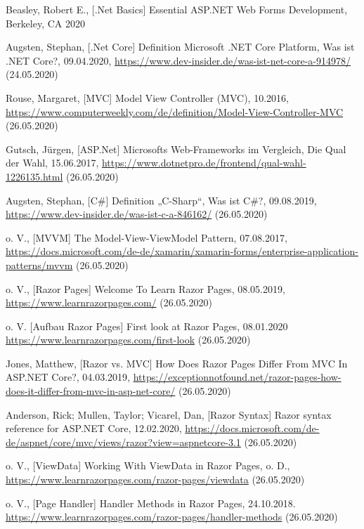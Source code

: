 \documentclass[a4paper,
12pt,
oneside]
{article}
\begin{document}
	\thispagestyle{empty}
	\nocite{*}
	\begin{thebibliography}{}
		 Beasley, Robert E., [.Net Basics] Essential ASP.NET Web Forms Development, Berkeley, CA 2020 
		
		 Augsten, Stephan, [.Net Core] Definition \glqq Microsoft .NET Core Platform\grqq, Was ist .NET Core?, 09.04.2020, \url{https://www.dev-insider.de/was-ist-net-core-a-914978/} (24.05.2020)
		
		 Rouse, Margaret, [MVC] Model View Controller (MVC), 10.2016, \url{https://www.computerweekly.com/de/definition/Model-View-Controller-MVC} (26.05.2020)
		
		 Gutsch, Jürgen, [ASP.Net] Microsofts Web-Frameworks im Vergleich, Die Qual der Wahl, 15.06.2017, \url{https://www.dotnetpro.de/frontend/qual-wahl-1226135.html} (26.05.2020)
		
		 Augsten, Stephan, [C\#] Definition „C-Sharp“, Was ist C\#?, 09.08.2019, \url{https://www.dev-insider.de/was-ist-c-a-846162/} (26.05.2020)
		
		 o. V., [MVVM] The Model-View-ViewModel Pattern, 07.08.2017, \url{https://docs.microsoft.com/de-de/xamarin/xamarin-forms/enterprise-application-patterns/mvvm} (26.05.2020)
		
		 o. V., [Razor Pages] Welcome To Learn Razor Pages, 08.05.2019, \url{https://www.learnrazorpages.com/} (26.05.2020)
		
		 o. V. [Aufbau Razor Pages] First look at Razor Pages, 08.01.2020 \url{https://www.learnrazorpages.com/first-look} (26.05.2020)
		
		 Jones, Matthew, [Razor vs. MVC] How Does Razor Pages Differ From MVC In ASP.NET Core?, 04.03.2019, \url{https://exceptionnotfound.net/razor-pages-how-does-it-differ-from-mvc-in-asp-net-core/} (26.05.2020)
		
		 Anderson, Rick; Mullen, Taylor; Vicarel, Dan, [Razor Syntax] Razor syntax reference for ASP.NET Core, 12.02.2020, \url{https://docs.microsoft.com/de-de/aspnet/core/mvc/views/razor?view=aspnetcore-3.1} (26.05.2020)
		
		 o. V., [ViewData] Working With ViewData in Razor Pages, o. D., \url{https://www.learnrazorpages.com/razor-pages/viewdata} (26.05.2020)
		
		 o. V., [Page Handler] Handler Methods in Razor Pages, 24.10.2018. \url{https://www.learnrazorpages.com/razor-pages/handler-methods} (26.05.2020)
	\end{thebibliography}
	\clearpage
	
\end{document}
